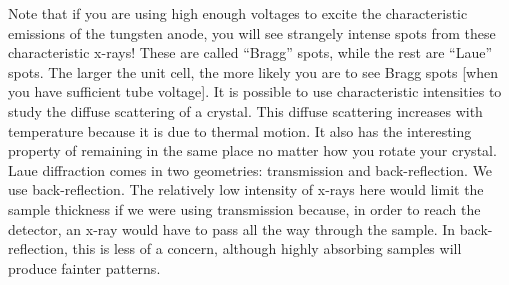 Note that if you are using high enough voltages to excite the characteristic emissions of the tungsten anode, you will see strangely intense spots from these characteristic x-rays! These are called “Bragg” spots, while the rest are “Laue” spots. The larger the unit cell, the more likely you are to see Bragg spots [when you have sufficient tube voltage].
It is possible to use characteristic intensities to study the diffuse scattering of a crystal. This diffuse scattering increases with temperature because it is due to thermal motion. It also has the interesting property of remaining in the same place no matter how you rotate your crystal.
Laue diffraction comes in two geometries: transmission and back-reflection. We use back-reflection. The relatively low intensity of x-rays here would limit the sample thickness if we were using transmission because, in order to reach the detector, an x-ray would have to pass all the way through the sample. In back-reflection, this is less of a concern, although highly absorbing samples will produce fainter patterns.
